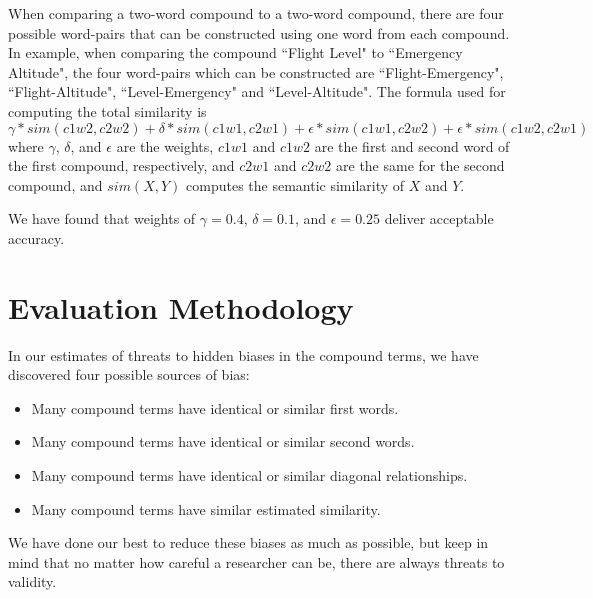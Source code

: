 \documentclass{article}
\begin{document}
When comparing a two-word compound to a two-word compound, there are four possible word-pairs that can be constructed using one word from each compound. In example, when comparing the compound ``Flight Level" to ``Emergency Altitude", the four word-pairs which can be constructed are ``Flight-Emergency", ``Flight-Altitude", ``Level-Emergency" and ``Level-Altitude".
The formula used for computing the total similarity is 
\begin{equation} \label{eq:2wordto2word}
	\gamma * sim(c1w2, c2w2) + \delta * sim(c1w1, c2w1) + \epsilon * sim(c1w1, c2w2) + \epsilon * sim(c1w2, c2w1)
\end{equation}
where $\gamma$, $\delta$, and $\epsilon$ are the weights, $c1w1$ and $c1w2$ are the first and second word of the first compound, respectively, and $c2w1$ and $c2w2$ are the same for the second compound, and $sim(X,Y)$ computes the semantic similarity of $X$ and $Y$. 

We have found that weights of $\gamma = 0.4$, $\delta = 0.1$, and $\epsilon = 0.25$ deliver acceptable accuracy.

\section{Evaluation Methodology} \label{sec:evalmeth}

In our estimates of threats to hidden biases in the compound terms, we have discovered four possible sources of bias:
\begin{itemize}
	\item Many compound terms have identical or similar first words.
	\item Many compound terms have identical or similar second words.
	\item Many compound terms have identical or similar diagonal relationships.
	\item Many compound terms have similar estimated similarity.
\end{itemize}
We have done our best to reduce these biases as much as possible, but keep in mind that no matter how careful a researcher can be, there are always threats to validity.
\end{document}
